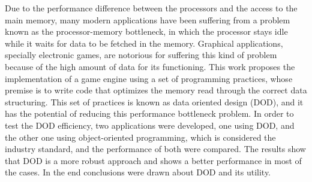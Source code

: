 Due to the performance difference between the processors and the access to the main 
memory, many modern applications have been suffering from a problem known as 
the processor-memory bottleneck, in which the processor stays idle while it waits for 
data to be fetched in the memory. Graphical applications, specially electronic games, are 
notorious for suffering this kind of problem because of the high amount of data 
for its functioning. This work proposes the implementation of a game engine
using a set of programming practices, whose premise is to write code that optimizes the 
memory read through the correct data structuring. This set of practices is known as data 
oriented design (DOD), and it has the potential of reducing this performance bottleneck 
problem. In order to test the DOD efficiency, two applications were developed, one using 
DOD, and the other one using object-oriented programming, which is considered the 
industry standard, and the performance of both were compared. The results show that DOD is 
a more robust approach and shows a better performance in most of the cases. In the end 
conclusions were drawn about DOD and its utility.

